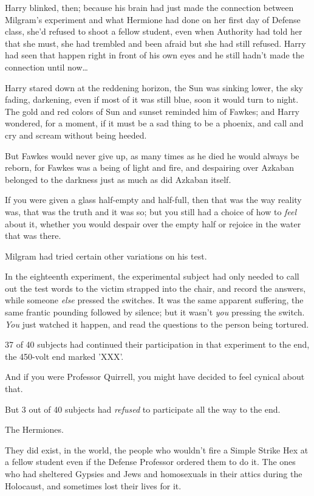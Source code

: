 Harry blinked, then; because his brain had just made the connection between 
Milgram's experiment and what Hermione had done on her first day of Defense 
class, she'd refused to shoot a fellow student, even when Authority had told 
her that she must, she had trembled and been afraid but she had still refused. 
Harry had seen that happen right in front of his own eyes and he still hadn't 
made the connection until now{\ldots}

Harry stared down at the reddening horizon, the Sun was sinking lower, the sky 
fading, darkening, even if most of it was still blue, soon it would turn to 
night. The gold and red colors of Sun and sunset reminded him of Fawkes; and 
Harry wondered, for a moment, if it must be a sad thing to be a phoenix, and 
call and cry and scream without being heeded.

But Fawkes would never give up, as many times as he died he would always be 
reborn, for Fawkes was a being of light and fire, and despairing over Azkaban 
belonged to the darkness just as much as did Azkaban itself.

If you were given a glass half-empty and half-full, then that was the way 
reality was, that was the truth and it was so; but you still had a choice of 
how to \emph{feel} about it, whether you would despair over the empty half or 
rejoice in the water that was there.

Milgram had tried certain other variations on his test.

In the eighteenth experiment, the experimental subject had only needed to call 
out the test words to the victim strapped into the chair, and record the 
answers, while someone \emph{else} pressed the switches. It was the same 
apparent suffering, the same frantic pounding followed by silence; but it 
wasn't \emph{you} pressing the switch. \emph{You} just watched it happen, and 
read the questions to the person being tortured.

37 of 40 subjects had continued their participation in that experiment to the 
end, the 450-volt end marked 'XXX'.

And if you were Professor Quirrell, you might have decided to feel cynical 
about that.

But 3 out of 40 subjects had \emph{refused} to participate all the way to the 
end.

The Hermiones.

They did exist, in the world, the people who wouldn't fire a Simple Strike Hex 
at a fellow student even if the Defense Professor ordered them to do it. The 
ones who had sheltered Gypsies and Jews and homosexuals in their attics during 
the Holocaust, and sometimes lost their lives for it.

